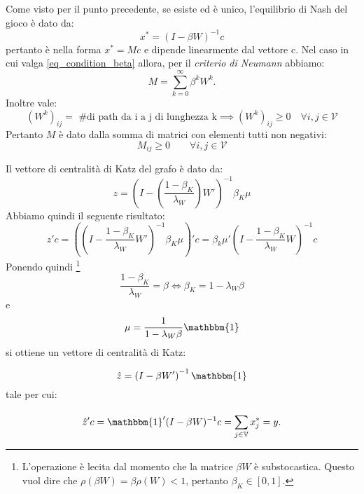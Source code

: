 \begin{alphaparts}
    \questionpart
    Come visto per il punto precedente, se esiste ed è unico, l'equilibrio di Nash del gioco è dato da:
    \[
        x^* = (I -\beta W)^{-1} c
        \]
    pertanto è nella forma \(x^* = Mc\) e dipende linearmente dal vettore c. Nel caso in cui valga \eqref{eq_condition_beta} allora, per il \textit{criterio di Neumann} abbiamo:
    \begin{equation} \label{eq_neumann}
        M =  \sum \limits_{k=0}^{\infty} \beta^k W^k
    .\end{equation}
    Inoltre vale:
    \begin{equation*}
        (W^k)_{ij} = \text{ \# di path da i a j di lunghezza k} \implies (W^k)_{ij} \geq 0 \quad \forall i, j \in \mathcal{V}
    \end{equation*}
    Pertanto \(M\) è dato dalla somma di matrici con elementi tutti non negativi:
    \[M_{ij} \geq 0 \quad \quad \forall i, j \in \mathcal{V}\]

    \questionpart
    Il vettore di centralità di Katz del grafo è dato da:
    \begin{equation*}
        z = \left(I - \left(\frac{1-\beta_K}{\lambda_W}\right)W'\right)^{-1}\beta_K \mu
    \end{equation*}
    Abbiamo quindi il seguente risultato:
    \[
    z'c = \left(\left(I - \frac{1 - \beta_K}{\lambda_W}W'\right)^{-1} \beta_K \mu\right)' c = \beta_k \mu' \left(I - \frac{1 - \beta_K}{\lambda_W}W\right)^{-1}c    
    \]
    Ponendo quindi \footnote{L'operazione è lecita dal momento che  la matrice \(\beta W\) è substocastica. Questo vuol dire che \(\rho(\beta W) = \beta \rho(W) < 1\), pertanto \(\beta_K \in [0,1]\).}
    \[ \frac{1 - \beta_K}{\lambda_W} = \beta \iff \beta_K = 1 - \lambda_W \beta \]
    e
    \[\mu = \frac{1}{1 - \lambda_W \beta} \mathbbm{1}\]
    si ottiene un vettore di centralità di Katz:
    
    \begin{equation}\label{eq_zhat}
        \hat{z} =\left(I - \beta W'\right)^{-1}\mathbbm{1}
    \end{equation}
    tale per cui:
    
    \begin{equation}\label{eq_yscalar}
        \hat{z}'c = \mathbbm{1}' (I - \beta W)^{-1} c =  \sum \limits_{j \in \mathbb{V}}^{} x^*_j = y.
    \end{equation}


\end{alphaparts}
